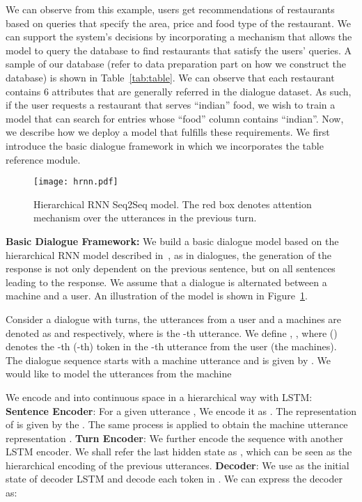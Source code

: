\documentclass[11pt,letterpaper]{article}
\begin{document}
We can observe from this example, users get recommendations of restaurants
based on queries that specify the area, price and food type of the
restaurant. We can support the system's decisions by incorporating a mechanism
that allows the model to query the database to find
restaurants that satisfy the users' queries.
A sample of our database (refer to data preparation part on how we construct
the database) is shown in Table~\ref{tab:table}. We can observe that each
restaurant contains 6 attributes that are generally referred in the dialogue
dataset. As such, if the user requests a restaurant that serves ``indian''
food, we wish to train a model that can search for entries whose ``food''
column contains ``indian''. Now, we describe how we deploy a model that
fulfills these requirements. We first introduce the basic dialogue framework
in which we incorporates the table reference module.



\begin{figure}[!t]
  \centering
  \texttt{[image: hrnn.pdf]}
  \caption{Hierarchical RNN Seq2Seq model. The red box denotes attention
  mechanism over the utterances in the previous turn.}
  \label{fig:hseq2seq}
  \vspace{-0.3cm}
\end{figure}
\noindent\textbf{Basic Dialogue Framework:} We build a basic dialogue model based on the hierarchical RNN model described
in~\citep{serban2016building}, as in dialogues, the generation of the response
is not only dependent on the previous sentence, but on all sentences leading to
the response.  We assume that a dialogue is alternated between a machine and a
user. An illustration of the model is shown in Figure~{\ref{fig:hseq2seq}}.

Consider a dialogue with  turns, the utterances from a user and a machines
are denoted as  and 
respectively, where  is the -th utterance. We define
, ,
where  () denotes the -th (-th) token in the -th
utterance from the user (the machines). The dialogue sequence starts with a
machine utterance and is given by
. We would like to model
the utterances from the machine



We encode  and  into continuous space in a hierarchical way
with LSTM: {\bf Sentence Encoder}: For a given utterance , 
We encode it as .
The representation of  is given by the .
The same process is applied to obtain the machine utterance representation
. {\bf Turn Encoder}: We further encode the sequence
 with another LSTM
encoder. 
We shall refer the last hidden state as , which can be
seen as the hierarchical encoding of the previous  utterances.
{\bf Decoder}: 
We use  as the initial state of decoder LSTM and
decode each token in . We can express the decoder as:
\end{document}
